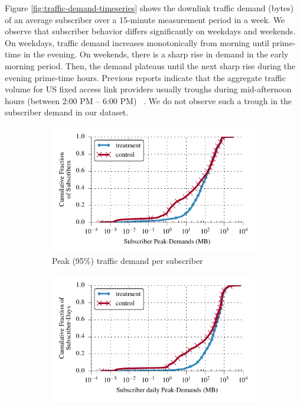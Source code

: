 Figure \ref{fig:traffic-demand-timeseries} shows the downlink traffic demand (bytes)
of an average subscriber over a 15-minute measurement period in a week.
We observe that subscriber behavior differs
significantly on weekdays and weekends. On weekdays, traffic demand 
increases monotonically from morning until prime-time in the evening. On 
weekends, there is a sharp rise in demand in the early morning period. Then, the
demand plateaus until the next sharp rise during the evening prime-time hours.
Previous reports indicate that the aggregate traffic volume for US fixed access
link providers usually troughs during mid-afternoon hours (between 2:00 PM -- 6:00 PM)
~\cite{sandvine20141h}. We do not observe such a trough in the subscriber 
demand in our dataset.

\begin{figure}[t]
\begin{minipage}{1\linewidth}
\centering
%
%
\begin{subfigure}[b]{1\linewidth}
\includegraphics[width=\linewidth]{figures/cdf_peak_demand-overall.pdf}
               \caption{Peak (95\%) traffic demand per subscriber\label{fig:CDF-data-rate-perc95}}
\end{subfigure}
%
\begin{subfigure}[b]{1\linewidth}
 \includegraphics[width=\linewidth]{figures/cdf_peak_demand-daily.pdf}

\end{subfigure}
\end{minipage}
\end{figure}
